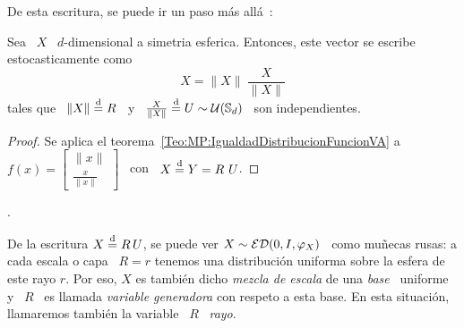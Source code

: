 De esta escritura, se puede ir un paso m\'as all\'a~\cite[Teo~2.3]{FanKot90}:
%
\begin{corolario}
  Sea  \ $X$ \  $d$-dimensional a  simetria esferica.  Entonces, este  vector se
  escribe estocasticamente como
  \[
  X =  \|X\| \: \frac{X}{\|X\|}
  \]
  tales  que  \ $\|  X  \|  \stackrel{\mathrm{d}}{=}  R$ \  y  \  $\frac{X}{\|X\|} \stackrel{\mathrm{d}}{=}  U  \sim
  \mathcal{U}(\mathbb{S}_d)$ \ son independientes.
\end{corolario}
%
\begin{proof}
  Se  aplica  el  teorema~\ref{Teo:MP:IgualdadDistribucionFuncionVA} a  \  $f(x)
  = \begin{bmatrix} \|x\|\\ \frac{x}{\|x\|} \end{bmatrix}$ \ con \ $X \stackrel{\mathrm{d}}{=} Y =
  R \ U$.
\end{proof}.

De la escritura  $X \stackrel{\mathrm{d}}{=} R \,  U$, se puede ver $X  \sim \mathcal{ED}(0,I,\varphi_X)$ \
como mu\~necas rusas: a cada escala o  capa \ $R = r$ tenemos una distribuci\'on
uniforma sobre la esfera de este rayo  $r$. Por eso, $X$ es tambi\'en dicho {\em
  mezcla de  escala} de  una {\em base}  \ uniforme  y \ $R$  \ es  llamada {\em
  variable generadora} con respeto a  esta base. En esta situaci\'on, llamaremos
tambi\'en la variable \ $R$ \ {\em rayo}.

